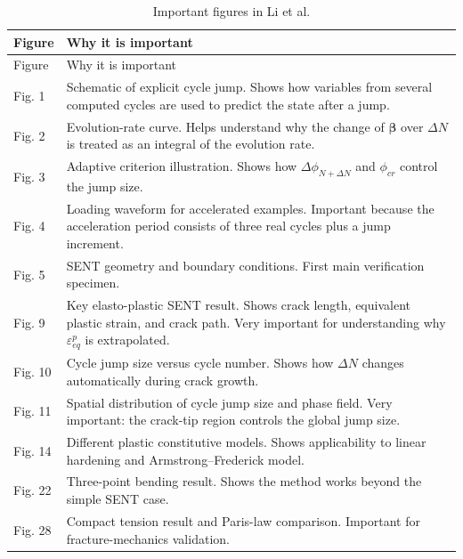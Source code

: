 \documentclass[11pt,a4paper]{article}
\begin{document}
\begin{longtable}{p{}p{}}
\caption{Important figures in Li et al.} \\
\toprule
Figure & Why it is important \\
\midrule
\endfirsthead
\toprule
Figure & Why it is important \\
\midrule
\endhead

Fig. 1 & Schematic of explicit cycle jump. Shows how variables from several computed cycles are used to predict the state after a jump. \\

Fig. 2 & Evolution-rate curve. Helps understand why the change of $\bm{\beta}$ over $\Delta N$ is treated as an integral of the evolution rate. \\

Fig. 3 & Adaptive criterion illustration. Shows how $\Delta \phi_{N+\Delta N}$ and $\phi_{cr}$ control the jump size. \\

Fig. 4 & Loading waveform for accelerated examples. Important because the acceleration period consists of three real cycles plus a jump increment. \\

Fig. 5 & SENT geometry and boundary conditions. First main verification specimen. \\

Fig. 9 & Key elasto-plastic SENT result. Shows crack length, equivalent plastic strain, and crack path. Very important for understanding why $\varepsilon_{eq}^p$ is extrapolated. \\

Fig. 10 & Cycle jump size versus cycle number. Shows how $\Delta N$ changes automatically during crack growth. \\

Fig. 11 & Spatial distribution of cycle jump size and phase field. Very important: the crack-tip region controls the global jump size. \\

Fig. 14 & Different plastic constitutive models. Shows applicability to linear hardening and Armstrong--Frederick model. \\

Fig. 22 & Three-point bending result. Shows the method works beyond the simple SENT case. \\

Fig. 28 & Compact tension result and Paris-law comparison. Important for fracture-mechanics validation. \\

\bottomrule
\end{longtable}
\end{document}
